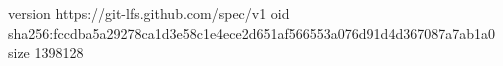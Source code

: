 version https://git-lfs.github.com/spec/v1
oid sha256:fccdba5a29278ca1d3e58c1e4ece2d651af566553a076d91d4d367087a7ab1a0
size 1398128
